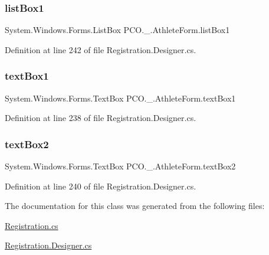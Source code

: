 \subsubsection{\texorpdfstring{list\+Box1}{listBox1}}
{\footnotesize\ttfamily System.\+Windows.\+Forms.\+List\+Box P\+C\+O.\+\_.\+Athlete\+Form.\+list\+Box1\hspace{0.3cm}{\ttfamily [private]}}



Definition at line 242 of file Registration.\+Designer.\+cs.

\mbox{\label{classPCO_1_1__0_1_1AthleteForm_a1e440213d1900de946894fdff1854cd0}} 
\subsubsection{\texorpdfstring{text\+Box1}{textBox1}}
{\footnotesize\ttfamily System.\+Windows.\+Forms.\+Text\+Box P\+C\+O.\+\_.\+Athlete\+Form.\+text\+Box1\hspace{0.3cm}{\ttfamily [private]}}



Definition at line 238 of file Registration.\+Designer.\+cs.

\mbox{\label{classPCO_1_1__0_1_1AthleteForm_a2099ea4a6adbe82e58e924892ba3154d}} 
\subsubsection{\texorpdfstring{text\+Box2}{textBox2}}
{\footnotesize\ttfamily System.\+Windows.\+Forms.\+Text\+Box P\+C\+O.\+\_.\+Athlete\+Form.\+text\+Box2\hspace{0.3cm}{\ttfamily [private]}}



Definition at line 240 of file Registration.\+Designer.\+cs.



The documentation for this class was generated from the following files\+:\begin{DoxyCompactItemize}
\item 
\hyperlink{Registration_8cs}{Registration.\+cs}\item 
\hyperlink{Registration_8Designer_8cs}{Registration.\+Designer.\+cs}\end{DoxyCompactItemize}
